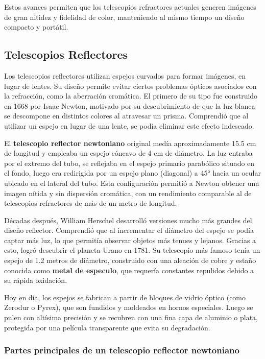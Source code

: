 Estos avances permiten que los telescopios refractores actuales generen imágenes de gran nitidez y fidelidad de color, manteniendo al mismo tiempo un diseño compacto y portátil.

\subsection{Telescopios Reflectores}

Los telescopios reflectores utilizan espejos curvados para formar imágenes, en lugar de lentes. Su diseño permite evitar ciertos problemas ópticos asociados con la refracción, como la aberración cromática. El primero de su tipo fue construido en 1668 por Isaac Newton, motivado por su descubrimiento de que la luz blanca se descompone en distintos colores al atravesar un prisma. Comprendió que al utilizar un espejo en lugar de una lente, se podía eliminar este efecto indeseado.

El \textbf{telescopio reflector newtoniano} original medía aproximadamente 15.5 cm de longitud y empleaba un espejo cóncavo de 4 cm de diámetro. La luz entraba por el extremo del tubo, se reflejaba en el espejo primario parabólico situado en el fondo, luego era redirigida por un espejo plano (diagonal) a 45° hacia un ocular ubicado en el lateral del tubo. Esta configuración permitió a Newton obtener una imagen nítida y sin dispersión cromática, con un rendimiento comparable al de telescopios refractores de más de un metro de longitud.

Décadas después, William Herschel desarrolló versiones mucho más grandes del diseño reflector. Comprendió que al incrementar el diámetro del espejo se podía captar más luz, lo que permitía observar objetos más tenues y lejanos. Gracias a esto, logró descubrir el planeta Urano en 1781. Su telescopio más famoso tenía un espejo de 1.2 metros de diámetro, construido con una aleación de cobre y estaño conocida como \textbf{metal de especulo}, que requería constantes repulidos debido a su rápida oxidación.

Hoy en día, los espejos se fabrican a partir de bloques de vidrio óptico (como Zerodur o Pyrex), que son fundidos y moldeados en hornos especiales. Luego se pulen con altísima precisión y se recubren con una fina capa de aluminio o plata, protegida por una película transparente que evita su degradación.

\subsubsection*{Partes principales de un telescopio reflector newtoniano}

